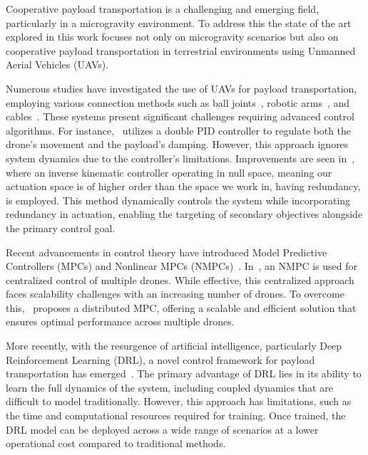 Cooperative payload transportation is a challenging and emerging field, particularly in a microgravity environment. To address this the state of the art explored in this work focuses not only on microgravity scenarios but also on cooperative payload transportation in terrestrial environments using Unmanned Aerial Vehicles (UAVs).

Numerous studies have investigated the use of UAVs for payload transportation, employing various connection methods such as ball joints~\cite{tagliabue2019robust,loianno2018localization}, robotic arms~\cite{lee2020visual,ouyang2021control}, and cables~\cite{li2021design,klausen2018cooperative,li2023nonlinear}. These systems present significant challenges requiring advanced control algorithms. For instance,~\cite{dhiman2018cooperative} utilizes a double PID controller to regulate both the drone’s movement and the payload’s damping. However, this approach ignores system dynamics due to the controller's limitations. Improvements are seen in~\cite{gimenez2018multi}, where an inverse kinematic controller operating in null space, meaning our actuation space is of higher order than the space we work in, having redundancy, is employed. This method dynamically controls the system while incorporating redundancy in actuation, enabling the targeting of secondary objectives alongside the primary control goal.

Recent advancements in control theory have introduced Model Predictive Controllers (MPCs) and Nonlinear MPCs (NMPCs)~\cite{li2023nonlinear,9341541}. In~\cite{li2023nonlinear}, an NMPC is used for centralized control of multiple drones. While effective, this centralized approach faces scalability challenges with an increasing number of drones. To overcome this,~\cite{9341541} proposes a distributed MPC, offering a scalable and efficient solution that ensures optimal performance across multiple drones. 

More recently, with the resurgence of artificial intelligence, particularly Deep Reinforcement Learning (DRL), a novel control framework for payload transportation has emerged~\cite{panetsos2022deep,lin2023payload,9345959}. The primary advantage of DRL lies in its ability to learn the full dynamics of the system, including coupled dynamics that are difficult to model traditionally. However, this approach has limitations, such as the time and computational resources required for training. Once trained, the DRL model can be deployed across a wide range of scenarios at a lower operational cost compared to traditional methods.

